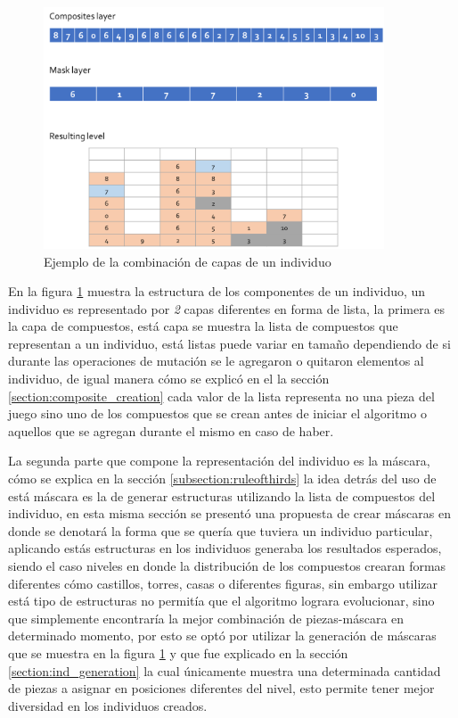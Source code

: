 \begin{figure}
  \centering
  \includegraphics[width=0.9\textwidth]{img/layer12_combine.png}
  \caption{Ejemplo de la combinación de capas de un individuo}
  \label{figure:individual_representation}
\end{figure}

En la figura \ref{figure:individual_representation} muestra la estructura de los
componentes de un individuo, un individuo es representado por \textit{2} capas
diferentes en forma de lista, la primera es la capa de compuestos, está capa se
muestra la lista de compuestos que representan a un individuo, está listas puede
variar en tamaño dependiendo de si durante las operaciones de mutación se le
agregaron o quitaron elementos al individuo, de igual manera cómo se explicó en
el la sección \ref{section:composite_creation} cada valor de la lista representa
no una pieza del juego sino uno de los compuestos que se crean antes de iniciar
el algoritmo o aquellos que se agregan durante el mismo en caso de haber.

La segunda parte que compone la representación del individuo es la máscara, cómo
se explica en la sección \ref{subsection:ruleofthirds} la idea detrás del uso de
está máscara es la de generar estructuras utilizando la lista de compuestos del
individuo, en esta misma sección se presentó una propuesta de crear máscaras en
donde se denotará la forma que se quería que tuviera un individuo particular,
aplicando estás estructuras en los individuos generaba los resultados esperados,
siendo el caso niveles en donde la distribución de los compuestos crearan formas
diferentes cómo castillos, torres, casas o diferentes figuras, sin embargo
utilizar está tipo de estructuras no permitía que el algoritmo lograra
evolucionar, sino que simplemente encontraría la mejor combinación de
piezas-máscara en determinado momento, por esto se optó por utilizar la
generación de máscaras que se muestra en la figura
\ref{figure:individual_representation} y que fue explicado en la sección
\ref{section:ind_generation} la cual únicamente muestra una determinada cantidad
de piezas a asignar en posiciones diferentes del nivel, esto permite tener mejor
diversidad en los individuos creados.

